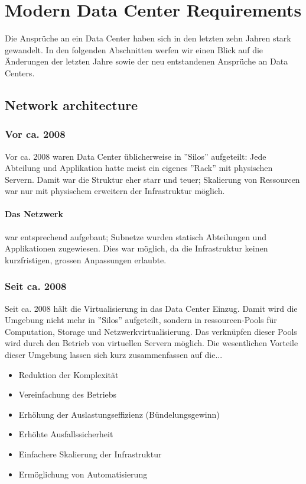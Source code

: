 

\newcommand{\SUBJECT}{Report}
\newcommand{\TITLE}{Cloud Infrastructre Lab 6}



\section{Modern Data Center Requirements}

Die Ansprüche an ein Data Center haben sich in den letzten zehn Jahren stark gewandelt. In den folgenden Abschnitten werfen wir einen Blick auf die Änderungen der letzten Jahre sowie der neu entstandenen Ansprüche an Data Centers.


\subsection{Network architecture}\label{sec:network-architecture}
\subsubsection{Vor ca. 2008}
Vor ca. 2008 waren Data Center üblicherweise in ''Silos'' aufgeteilt: Jede Abteilung und Applikation hatte meist ein eigenes ''Rack'' mit physischen Servern. Damit war die Struktur eher starr und teuer; Skalierung von Ressourcen war nur mit physischem erweitern der Infrastruktur möglich.

\paragraph{Das Netzwerk} war entsprechend aufgebaut; Subnetze wurden statisch Abteilungen und Applikationen zugewiesen. Dies war möglich, da die Infrastruktur keinen kurzfristigen, grossen Anpassungen erlaubte.

\subsubsection{Seit ca. 2008}
Seit ca. 2008 hält die Virtualisierung in das Data Center Einzug. Damit wird die Umgebung nicht mehr in ''Silos'' aufgeteilt, sondern in ressourcen-Pools für Computation, Storage und Netzwerkvirtualisierung. Das verknüpfen dieser Pools wird durch den Betrieb von virtuellen Servern möglich. Die wesentlichen Vorteile dieser Umgebung lassen sich kurz zusammenfassen auf die...
\begin{itemize}
	\item Reduktion der Komplexität
	\item Vereinfachung des Betriebs
	\item Erhöhung der Auslastungseffizienz (Bündelungsgewinn)
	\item Erhöhte Ausfallssicherheit
	\item Einfachere Skalierung der Infrastruktur
	\item Ermöglichung von Automatisierung
\end{itemize}

